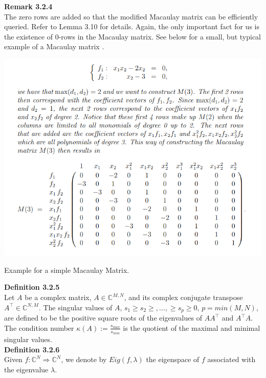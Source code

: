 \documentclass[a4paper,11pt]{article}
\begin{document}
\begin{otherlanguage}{english}
\noindent
\textbf{Remark 3.2.4} \\
The zero rows are added so that the modified Macaulay matrix can be efficiently queried. Refer to Lemma 3.10 for details. Again, the only important fact for us is the existence of $0$-rows in the Macaulay matrix. 
See below for a small, but typical example of a Macaulay matrix \cite{BDM}. \\

\begin{figurehere}
  \centering
  \includegraphics[width=14cm]{Macaulay.png}
  \caption{Example for a simple Macaulay Matrix.\label{abb_1}}
\end{figurehere}
\vspace{0.3cm}

\noindent
\textbf{Definition 3.2.5} \\
Let $A$ be a complex matrix, $A \in \mathbb{C}^{M,N}$, and its complex conjugate transpose $A^\intercal \in \mathbb{C}^{N,M}$. The singular values of $A, \, s_1 \geq s_2 \geq,...,\geq s_p \geq 0, \, p = min(M,N)$, are defined to be the positive square roots of the eigenvalues of $AA^\intercal$ and $A^\intercal A$. The condition number $\kappa(A) := \frac{s_{max}}{s_{min}}$ is the quotient of the maximal and minimal singular values. \\

\noindent
\textbf{Definition 3.2.6} \\
Given $f: \mathbb{C}^N \Rightarrow \mathbb{C}^N$, we denote by $Eig(f,\lambda)$ the eigenspace of $f$ associated with the eigenvalue $\lambda$. \\


\end{otherlanguage}
\end{document}

